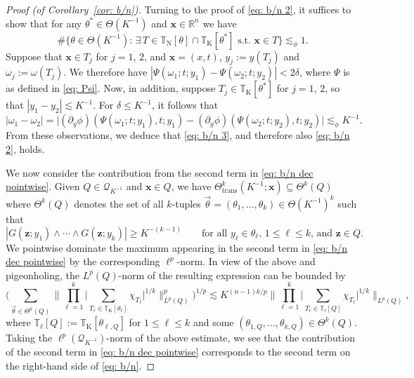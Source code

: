 \documentclass[reqno]{amsart}
\numberwithin{equation}{section}
\newcommand{\R}{\mathbb{R}}
\newcommand{\T}{\mathbb{T}}
\newcommand{\cQ}{\mathcal{Q}}
\newcommand{\bx}{\mathbf{x}}
\newcommand{\bz}{\mathbf{z}}
\theoremstyle{plain}
\theoremstyle{definition}
\newcommand{\trans}{\mathrm{trans}}
\begin{document}
\begin{proof}[Proof (of Corollary~\ref{cor: b/n})]
Turning to the proof of \eqref{eq: b/n 2}, it suffices to show that for any $\theta^* \in \Theta(K^{-1})$ and $\bx \in \R^n$ we have
\begin{equation}\label{eq: b/n 3}
    \#\big\{ \theta \in \Theta(K^{-1}) : \, \exists\, T \in \mathbb{T}_{\mathrm{N}}[\theta]\cap\mathbb{T}_{\mathrm{K}}[\theta^*] \textrm{ s.t. } \bx \in T \big\} \lesssim_\phi 1.
\end{equation}
Suppose that  $\bx \in T_j$ for $j = 1$, $2$, and $\bx = (x,t)$, $y_j := y(T_j)$ and $\omega_j := \omega(T_j)$. We therefore have $ |\Psi(\omega_1; t; y_1) - \Psi(\omega_2; t; y_2)| < 2\delta$, where $\Psi$ is as defined in \eqref{eq: Psi}. Now, in addition, suppose $T_j \in \T_{\mathrm{K}}[\theta^*]$ for $j = 1$, $2$, so that $|y_1 - y_2| \lesssim K^{-1}$. For $\delta \le K^{-1}$, it follows that 
\begin{equation*}
   |\omega_1 - \omega_2| = \big|(\partial_y \phi)(\Psi(\omega_1; t; y_1),t;y_1) - (\partial_y \phi)(\Psi(\omega_2; t; y_2),t;y_2)\big| \lesssim_\phi K^{-1}.
\end{equation*}
From these observations, we deduce that \eqref{eq: b/n 3}, and therefore also \eqref{eq: b/n 2}, holds. 

We now consider the contribution from the second term in \eqref{eq: b/n dec pointwise}. Given $Q \in \cQ_{K^{-1}}$ and $\bx \in Q$, we have $\Theta^k_{\trans}(K^{-1}; \bx) \subseteq \Theta^k(Q)$ where $\Theta^k(Q)$ denotes the set of all $k$-tuples $\vec{\theta} = (\theta_1, \dots, \theta_k) \in \Theta(K^{-1})^k$ such that
\begin{equation*}
    |G(\bz;y_1) \wedge \cdots \wedge G(\bz;y_k)| \geq K^{-(k-1)} \qquad \textrm{for all $y_{\ell} \in \theta_{\ell}$, $1 \leq \ell \leq k$, and $\bz \in Q$.}
\end{equation*}
We pointwise dominate the maximum appearing in the second term in \eqref{eq: b/n dec pointwise} by the corresponding $\ell^p$-norm. In view of the above and pigeonholing, the $L^p(Q)$-norm of the resulting expression can be bounded by
\begin{equation*}
    \Big(\sum_{\vec{\theta} \in \Theta^k(Q)} \Big\| \prod_{\ell = 1}^k \big|\sum_{T_{\ell} \in \T_{\mathrm{K}}[\theta_{\ell}]} \chi_{T_{\ell}}\big|^{1/k} \Big\|_{L^p(Q)}^p\Big)^{1/p} \lesssim K^{(n-1)k/p} \Big\| \prod_{\ell = 1}^k\big|\sum_{T_{\ell} \in \T_{\ell}[Q]} \chi_{T_{\ell}}\big|^{1/k} \Big\|_{L^p(Q)},
\end{equation*}
where $\T_{\ell}[Q] := \T_{\mathrm{K}}[\theta_{\ell, Q}]$ for $1 \leq \ell \leq k$ and some $(\theta_{1,Q}, \dots, \theta_{k,Q}) \in \Theta^k(Q)$. Taking the $\ell^p(\cQ_{K^{-1}})$-norm of the above estimate, we see that the contribution of the second term in \eqref{eq: b/n dec pointwise} corresponds to the second term on the right-hand side of \eqref{eq: b/n}.



\end{proof}
\end{document}
